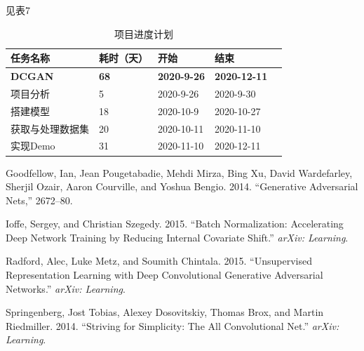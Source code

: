 \documentclass[
  hyperref, a4paper]{ctexart}
\begin{document}
见表7

\begin{table}
    \caption{项目进度计划}
    \centering
    \begin{tabular}{|p{2.0cm}<{\centering}|p{1.0cm}<{\centering}|p{2.0cm}<{\centering}|p{2.0cm}<{\centering}|p{2.0cm}<{\centering}|}
    \hline
    任务名称     & 耗时（天） & 开始         & 结束         \\ \hline
    \textbf{DCGAN}    & \textbf{68}    & \textbf{2020-9-26}  & \textbf{2020-12-11} \\ \hline
    项目分析     & 5     & 2020-9-26  & 2020-9-30  \\ \hline
    搭建模型     & 18     & 2020-10-9  & 2020-10-27 \\ \hline
    获取与处理数据集 & 20     & 2020-10-11 & 2020-11-10 \\ \hline
    实现Demo   & 31    & 2020-11-10 & 2020-12-11 \\ \hline
    \end{tabular}
\end{table}

\hypertarget{refs}{}
\leavevmode\hypertarget{ref-goodfellow2014generative}{}%
Goodfellow, Ian, Jean Pougetabadie, Mehdi Mirza, Bing Xu, David
Wardefarley, Sherjil Ozair, Aaron Courville, and Yoshua Bengio. 2014.
``Generative Adversarial Nets,'' 2672--80.

\leavevmode\hypertarget{ref-ioffe2015batch}{}%
Ioffe, Sergey, and Christian Szegedy. 2015. ``Batch Normalization:
Accelerating Deep Network Training by Reducing Internal Covariate
Shift.'' \emph{arXiv: Learning}.

\leavevmode\hypertarget{ref-radford2015unsupervised}{}%
Radford, Alec, Luke Metz, and Soumith Chintala. 2015. ``Unsupervised
Representation Learning with Deep Convolutional Generative Adversarial
Networks.'' \emph{arXiv: Learning}.

\leavevmode\hypertarget{ref-springenberg2014striving}{}%
Springenberg, Jost Tobias, Alexey Dosovitskiy, Thomas Brox, and Martin
Riedmiller. 2014. ``Striving for Simplicity: The All Convolutional
Net.'' \emph{arXiv: Learning}.
\end{document}
